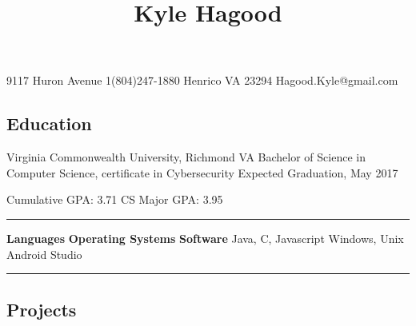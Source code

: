 \documentclass{article}
\title{\vspace{-5ex}Kyle Hagood\vspace{-4ex}}
\date{}
\begin{document}
\begin{mdframed}
9117 Huron Avenue \hfill 1(804)247-1880 \newline
Henrico VA 23294 \hfill Hagood.Kyle@gmail.com
{\let\newpage\relax\maketitle}		
\end{mdframed}

\subsection*{Education}
\begin{center}
\hspace*{1.0in}Virginia Commonwealth University, Richmond VA \newline
\hspace*{1.0in}Bachelor of Science in Computer Science, certificate in Cybersecurity \newline
Expected Graduation, May 2017
\end{center}
\hspace*{1.0in}Cumulative GPA: 3.71 \hfill CS Major GPA: 3.95\hspace*{1.0in}

\begin{center} \noindent\rule{8cm}{0.1pt} \end{center}

\large \textbf{Languages} \hfill \textbf{Operating Systems} \hfill \textbf{Software} \newline \normalsize Java, C, Javascript \hfill Windows, Unix \hfill Android Studio

\begin{center} \noindent\rule{10cm}{0.1pt} \end{center}

\subsection*{Projects}
\end{document}
